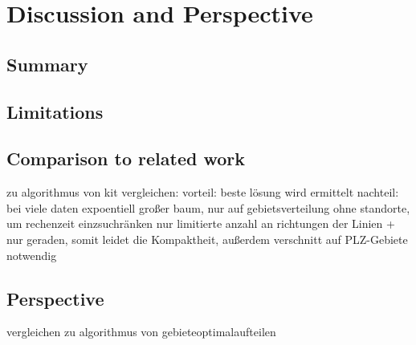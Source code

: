 \section{Discussion and Perspective}
\subsection{Summary}
\subsection{Limitations}
\subsection{Comparison to related work}

zu algorithmus von kit vergleichen:
vorteil: beste lösung wird ermittelt
nachteil: bei viele daten expoentiell großer baum, nur auf gebietsverteilung ohne standorte, um rechenzeit einzsuchränken nur limitierte anzahl an richtungen der Linien + nur geraden, somit leidet die Kompaktheit, außerdem verschnitt auf PLZ-Gebiete notwendig


\subsection{Perspective}

vergleichen zu algorithmus von gebieteoptimalaufteilen